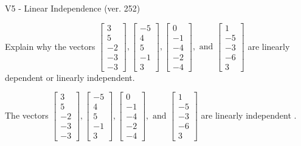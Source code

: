 \begin{exercise}
  \begin{exerciseTitle}V5 - Linear Independence (ver. 252)\end{exerciseTitle}
  \begin{exerciseStatement}
    Explain why the vectors \(\left[\begin{array}{r}
3 \\
5 \\
-2 \\
-3 \\
-3
\end{array}\right] , \left[\begin{array}{r}
-5 \\
4 \\
5 \\
-1 \\
3
\end{array}\right] , \left[\begin{array}{r}
0 \\
-1 \\
-4 \\
-2 \\
-4
\end{array}\right] , \text{ and } \left[\begin{array}{r}
1 \\
-5 \\
-3 \\
-6 \\
3
\end{array}\right]\) are linearly dependent or linearly independent.	


  \end{exerciseStatement}
  \begin{exerciseAnswer}
   The vectors \(\left[\begin{array}{r}
3 \\
5 \\
-2 \\
-3 \\
-3
\end{array}\right] , \left[\begin{array}{r}
-5 \\
4 \\
5 \\
-1 \\
3
\end{array}\right] , \left[\begin{array}{r}
0 \\
-1 \\
-4 \\
-2 \\
-4
\end{array}\right] , \text{ and } \left[\begin{array}{r}
1 \\
-5 \\
-3 \\
-6 \\
3
\end{array}\right]\) are 
  	 linearly independent  .
  


  \end{exerciseAnswer}
\end{exercise}